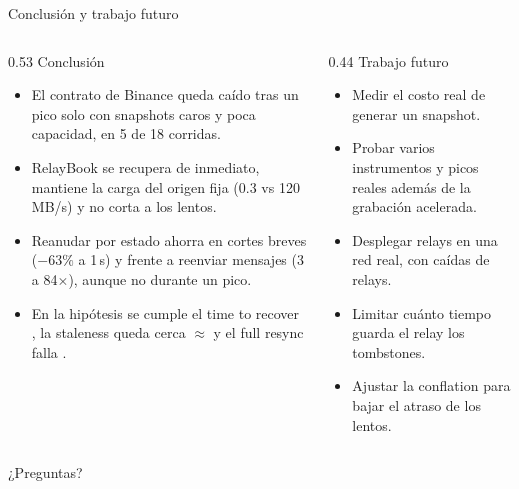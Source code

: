 \begin{frame}{Conclusión y trabajo futuro}
  \begin{columns}[T]
    \begin{column}{0.53\textwidth}\small
      {\large\color{colAcento}Conclusión}
      \begin{itemize}\setlength{\itemsep}{3pt}
        \item El contrato de Binance queda caído tras un pico solo con
          snapshots caros y poca capacidad, en 5 de 18 corridas.
        \item RelayBook se recupera de inmediato, mantiene la carga
          del origen fija (0.3 vs 120\,MB/s) y no corta a los lentos.
        \item Reanudar por estado ahorra en cortes breves ($-63\%$ a 1\,s) y
          frente a reenviar mensajes (3 a 84$\times$), aunque no durante un pico.
        \item En la hipótesis se cumple el time to recover \okmark, la staleness queda cerca $\approx$ y el full resync falla \xmark.
      \end{itemize}
    \end{column}
    \begin{column}{0.44\textwidth}\small
      {\large\color{colAcento}Trabajo futuro}
      \begin{itemize}\setlength{\itemsep}{3pt}
        \item Medir el costo real de generar un snapshot.
        \item Probar varios instrumentos y picos reales además de la
          grabación acelerada.
        \item Desplegar relays en una red real, con caídas de relays.
        \item Limitar cuánto tiempo guarda el relay los tombstones.
        \item Ajustar la conflation para bajar el atraso de los lentos.
      \end{itemize}
    \end{column}
  \end{columns}
  \vspace{4mm}\hfill{\large\color{colAcento}¿Preguntas?}
\end{frame}
